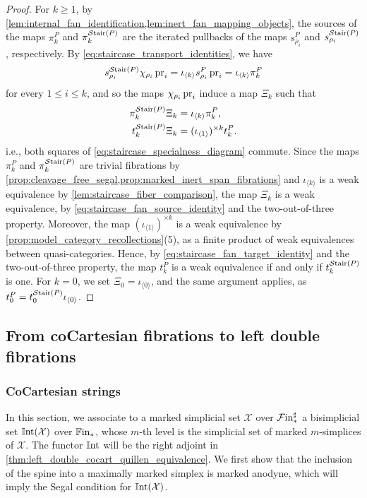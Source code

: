 \documentclass[10pt,reqno]{amsart}
\begin{document}
\begin{proof}
For $k\geq1$, by
\cref{lem:internal_fan_identification,lem:inert_fan_mapping_objects},
the sources of the maps $\pi_k^P$ and $\pi_k^{\mathcal{S}\mathrm{tair}(P)}$ are the
iterated pullbacks of the maps $s_{\rho_i}^P$ and
$s_{\rho_i}^{\mathcal{S}\mathrm{tair}(P)}$, respectively. By
\eqref{eq:staircase_transport_identities}, we have
\[
 s_{\rho_i}^{\mathcal{S}\mathrm{tair}(P)}\chi_{\rho_i}\operatorname{pr}_i
 =\iota_{\langle k\rangle}s_{\rho_i}^P\operatorname{pr}_i
 =\iota_{\langle k\rangle}\pi_k^P
\]
for every $1\leq i\leq k$, and so the maps $\chi_{\rho_i}\operatorname{pr}_i$
induce a map $\Xi_k$ such that
\begin{align}
 \pi_k^{\mathcal{S}\mathrm{tair}(P)}\Xi_k
 &=\iota_{\langle k\rangle}\pi_k^P,
 \label{eq:staircase_fan_source_identity}\\
 t_k^{\mathcal{S}\mathrm{tair}(P)}\Xi_k
 &=(\iota_{\langle1\rangle})^{\times k}t_k^P.
 \label{eq:staircase_fan_target_identity}
\end{align}
i.e., both squares of \eqref{eq:staircase_specialness_diagram}
commute. Since the maps $\pi_k^P$ and $\pi_k^{\mathcal{S}\mathrm{tair}(P)}$ are
trivial fibrations by
\cref{prop:cleavage_free_segal,prop:marked_inert_span_fibrations} and
$\iota_{\langle k\rangle}$ is a weak equivalence by
\cref{lem:staircase_fiber_comparison}, the map $\Xi_k$ is a weak
equivalence, by \eqref{eq:staircase_fan_source_identity} and the
two-out-of-three property. Moreover, the map
$(\iota_{\langle1\rangle})^{\times k}$ is a weak equivalence by
\cref{prop:model_category_recollections}(5), as a finite product of
weak equivalences between quasi-categories. Hence, by
\eqref{eq:staircase_fan_target_identity} and the two-out-of-three
property, the map $t_k^P$ is a weak equivalence if and only if
$t_k^{\mathcal{S}\mathrm{tair}(P)}$ is one. For $k=0$, we set
$\Xi_0=\iota_{\langle0\rangle}$, and the same argument applies, as
$t_0^P=t_0^{\mathcal{S}\mathrm{tair}(P)}\iota_{\langle0\rangle}$.
\end{proof}

\subsection{From coCartesian fibrations to left double fibrations}
\label{subsec:comparison_enriched_to_internal}
\subsubsection{CoCartesian strings}

\label{subsubsec:horizontal_construction}

In this section, we associate to a marked simplicial set
$\mathcal X$ over $\mathcal{F}\mathrm{in}_*^\sharp$ a bisimplicial set
$\mathbb{I}\mathrm{nt}(\mathcal X)$ over $\mathbb{F}\mathrm{in}_*$, whose $m$-th level is the
simplicial set of marked $m$-simplices of $\mathcal X$. The functor
$\mathbb{I}\mathrm{nt}$ will be the right adjoint in
\cref{thm:left_double_cocart_quillen_equivalence}. We first show that
the inclusion of the spine into a maximally marked simplex is marked
anodyne, which will imply the Segal condition for $\mathbb{I}\mathrm{nt}(\mathcal X)$.
\end{document}
